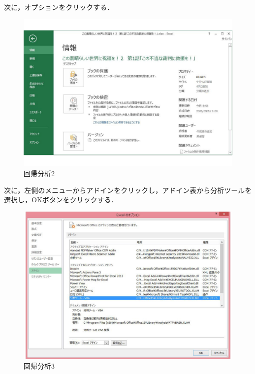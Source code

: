 \clearpage

次に，オプションをクリックする．

\begin{figure}[htb]
\centering
\includegraphics[width=14cm]{ekuseru03.pdf}
\caption{回帰分析2}\label{ace}
\end{figure}

\clearpage

次に，左側のメニューからアドインをクリックし，アドイン表から分析ツールを選択し，OKボタンをクリックする．

\begin{figure}[htb]
\centering
\includegraphics[width=14cm]{ekuseru04.pdf}
\caption{回帰分析3}\label{ace}
\end{figure}

\clearpage


